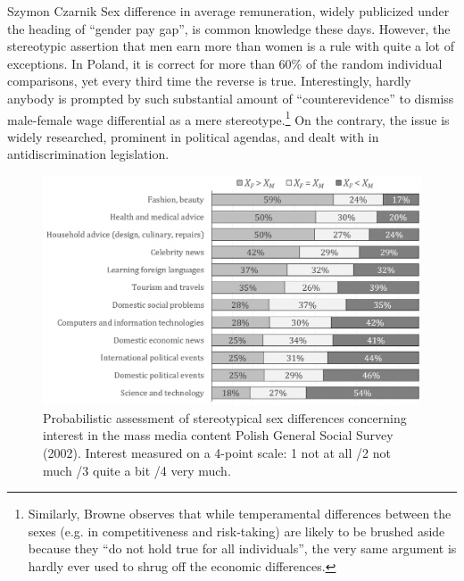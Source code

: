 \begin{artengenv}{Szymon Czarnik}
Sex difference in average remuneration, widely publicized under the heading of ``gender pay gap'', is common knowledge these days. However, the stereotypic assertion that men earn more than women is a rule with quite a lot of exceptions. In Poland, it is correct for more than 60\% of the random individual comparisons, yet every third time the reverse is true. Interestingly, hardly anybody is prompted by such substantial amount of ``counterevidence'' to dismiss male-female wage differential as a mere stereotype.\footnote{Similarly, Browne
\parencite*[][]{browne_divided_1998} %
 observes that while temperamental differences between the sexes (e.g. in competitiveness and risk-taking) are likely to be brushed aside because they ``do not hold true for all individuals'', the very same argument is hardly ever used to shrug off the economic differences. } On the contrary, the issue is widely researched, prominent in political agendas, and dealt with in antidiscrimination legislation.

\begin{figure}[H]
	\centering
   \includegraphics[width=\textwidth]{ART_Czarnik/Czarnik-img021.jpg}
\caption{Probabilistic assessment of stereotypical sex differences concerning interest in the mass media content Polish General Social Survey (2002). Interest measured on a 4-point scale: 1 not at all /2 not much /3 quite a bit /4 very much.}\label{fig5-czar}
\end{figure}


\end{artengenv}
